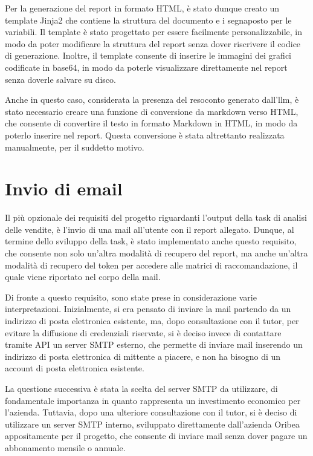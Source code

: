 Per la generazione del report in formato HTML, è stato dunque creato un template Jinja2 che contiene la struttura del documento e i segnaposto per le variabili. Il template è stato progettato per essere facilmente personalizzabile, in modo da poter modificare la struttura del report senza dover riscrivere il codice di generazione. Inoltre, il template consente di inserire le immagini dei grafici codificate in base64, in modo da poterle visualizzare direttamente nel report senza doverle salvare su disco.

Anche in questo caso, considerata la presenza del resoconto generato dall'\gls{llm}, è stato necessario creare una funzione di conversione da markdown verso HTML, che consente di convertire il testo in formato Markdown in HTML, in modo da poterlo inserire nel report. Questa conversione è stata altrettanto realizzata manualmente, per il suddetto motivo.

\section{Invio di email}

Il più opzionale dei requisiti del progetto riguardanti l'output della task di analisi delle vendite, è l'invio di una mail all'utente con il report allegato. Dunque, al termine dello sviluppo della task, è stato implementato anche questo requisito, che consente non solo un'altra modalità di recupero del report, ma anche un'altra modalità di recupero del token per accedere alle matrici di raccomandazione, il quale viene riportato nel corpo della mail.

Di fronte a questo requisito, sono state prese in considerazione varie interpretazioni.
Inizialmente, si era pensato di inviare la mail partendo da un indirizzo di posta elettronica esistente, ma, dopo consultazione con il tutor, per evitare la diffusione di credenziali riservate, si è deciso invece di contattare tramite API un server SMTP esterno, che permette di inviare mail inserendo un indirizzo di posta elettronica di mittente a piacere, e non ha bisogno di un account di posta elettronica esistente.

La questione successiva è stata la scelta del server SMTP da utilizzare, di fondamentale importanza in quanto rappresenta un investimento economico per l'azienda.
Tuttavia, dopo una ulteriore consultazione con il tutor, si è deciso di utilizzare un server SMTP interno, sviluppato direttamente dall'azienda Oribea appositamente per il progetto, che consente di inviare mail senza dover pagare un abbonamento mensile o annuale.

